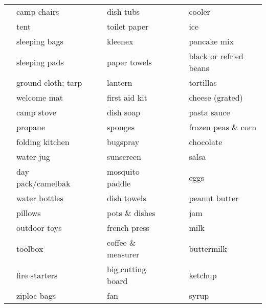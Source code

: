 \documentclass[10pt]{article}
\newcommand{\mybox}{\framebox[4mm]{\textcolor{white} m} \framebox[4mm]{\textcolor{white} m} }
\begin{document}
\pagestyle{empty}



\renewcommand{\arraystretch}{1.5}

\begin{tabular}{rlcrlcrl} \hline
\mybox & camp chairs   &\hspace{13mm}&\mybox & dish tubs   &\hspace{13mm}&\mybox & cooler \\
\mybox & tent                   &    &\mybox & toilet paper         &    &\mybox & ice \\
\mybox & sleeping bags          &    &\mybox & kleenex              &    &\mybox & pancake mix \\
\mybox & sleeping pads          &    &\mybox & paper towels         &    &\mybox & black or refried beans \\
\mybox & ground cloth; tarp     &    &\mybox & lantern              &    &\mybox & tortillas \\
\mybox & welcome mat            &    &\mybox & first aid kit        &    &\mybox & cheese (grated) \\
\mybox & camp stove             &    &\mybox & dish soap            &    &\mybox & pasta sauce \\
\mybox & propane                &    &\mybox & sponges              &    &\mybox & frozen peas \& corn \\
\mybox & folding kitchen        &    &\mybox & bugspray             &    &\mybox & chocolate \\
\mybox & water jug              &    &\mybox & sunscreen            &    &\mybox & salsa \\
\mybox & day pack/camelbak      &    &\mybox & mosquito paddle      &    &\mybox & eggs \\ \cline{4-5}
\mybox & water bottles          &    &\mybox & dish towels          &    &\mybox & peanut butter \\
\mybox & pillows                &    &\mybox & pots \& dishes       &    &\mybox & jam \\
\mybox & outdoor toys           &    &\mybox & french press         &    &\mybox & milk \\ \cline{1-2}
\mybox & toolbox                &    &\mybox & coffee \& measurer   &    &\mybox & buttermilk \\
\mybox & fire starters          &    &\mybox & big cutting board    &    &\mybox & ketchup \\
\mybox & ziploc bags            &    &\mybox & fan                  &    &\mybox & syrup \\

\end{tabular}
\end{document}
